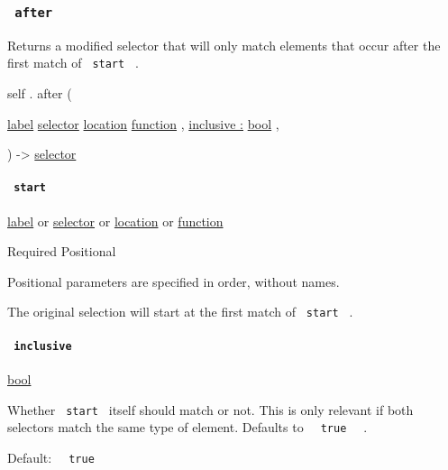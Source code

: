 \subsubsection{\texorpdfstring{\texttt{\ after\ }}{ after }}\label{definitions-after}

Returns a modified selector that will only match elements that occur
after the first match of \texttt{\ start\ } .

self { . } { after } (

{ \href{/docs/reference/foundations/label/}{label}
\href{/docs/reference/foundations/selector/}{selector}
\href{/docs/reference/introspection/location/}{location}
\href{/docs/reference/foundations/function/}{function} , } {
\hyperref[definitions-after-parameters-inclusive]{inclusive :}
\href{/docs/reference/foundations/bool/}{bool} , }

) -\textgreater{} \href{/docs/reference/foundations/selector/}{selector}

\paragraph{\texorpdfstring{\texttt{\ start\ }}{ start }}\label{definitions-after-start}

\href{/docs/reference/foundations/label/}{label} {or}
\href{/docs/reference/foundations/selector/}{selector} {or}
\href{/docs/reference/introspection/location/}{location} {or}
\href{/docs/reference/foundations/function/}{function}

{Required} {{ Positional }}

\label{definitions-after-start-positional-tooltip}
Positional parameters are specified in order, without names.

The original selection will start at the first match of
\texttt{\ start\ } .

\paragraph{\texorpdfstring{\texttt{\ inclusive\ }}{ inclusive }}\label{definitions-after-inclusive}

\href{/docs/reference/foundations/bool/}{bool}

Whether \texttt{\ start\ } itself should match or not. This is only
relevant if both selectors match the same type of element. Defaults to
\texttt{\ }{\texttt{\ true\ }}\texttt{\ } .

Default: \texttt{\ }{\texttt{\ true\ }}\texttt{\ }


